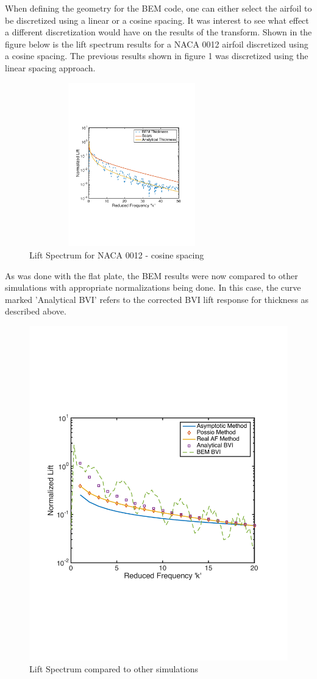\documentclass{article}
\begin{document}
\newpage

\noindent When defining the geometry for the BEM code, one can either select the airfoil to be discretized using a linear or a cosine spacing. It was interest to see what effect a different discretization would have on the results of the transform. Shown in the figure below is the lift spectrum results for a NACA 0012 airfoil discretized using a cosine spacing. The previous results shown in figure 1 was discretized using the linear spacing approach. 

\begin{figure}[h]
\includegraphics[width = 3.5in, height = 2.8in]{BEM_Cosine_0012}
\centering
\caption{Lift Spectrum for NACA 0012 - cosine spacing}
\end{figure}

As was done with the flat plate, the BEM results were now compared to other simulations with appropriate normalizations being done. In this case, the curve marked 'Analytical BVI' refers to the corrected BVI lift response for thickness as described above. 

\begin{figure}[h]
\includegraphics[width = 3.8 in, height = 3  in]{BEM_total_compare}
\centering
\caption{Lift Spectrum compared to other simulations}
\end{figure}
\end{document}
